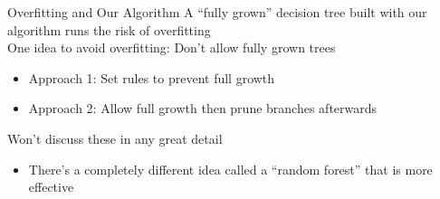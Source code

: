 \documentclass[aspectratio=169]{../latex_main/tntbeamer}  %
\begin{document}
	\begin{frame}{Overfitting and Our Algorithm}
	    A “fully grown” decision tree built with our algorithm runs the risk of overfitting\\
	    \bigskip
	    One idea to avoid overfitting: Don’t allow fully grown trees
	    \begin{itemize}
	        \item Approach 1: Set rules to prevent full growth
	        \item Approach 2: Allow full growth then prune branches afterwards
	    \end{itemize}
	    
        Won’t discuss these in any great detail
        \begin{itemize}
            \item There’s a completely different idea called a “random forest” that is more effective
        \end{itemize}
	\end{frame}
\end{document}
